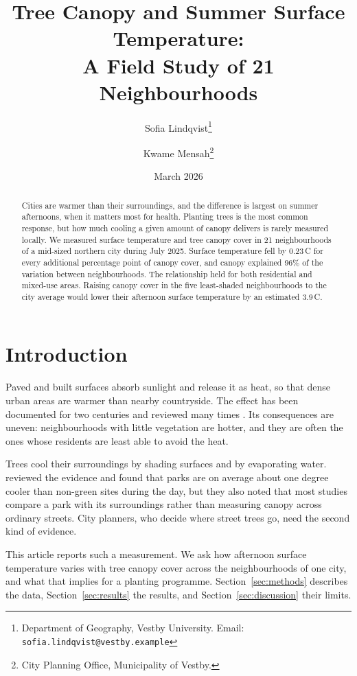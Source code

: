 \documentclass[11pt,a4paper]{article}
\title{Tree Canopy and Summer Surface Temperature:\\A Field Study of 21 Neighbourhoods}
\author{Sofia Lindqvist\thanks{Department of Geography, Vestby University. Email: \texttt{sofia.lindqvist@vestby.example}}
\and Kwame Mensah\thanks{City Planning Office, Municipality of Vestby.}}
\date{March 2026}
\begin{document}
\maketitle

\begin{abstract}
Cities are warmer than their surroundings, and the difference is largest on summer afternoons, when it matters most for health. Planting trees is the most common response, but how much cooling a given amount of canopy delivers is rarely measured locally. We measured surface temperature and tree canopy cover in 21 neighbourhoods of a mid-sized northern city during July 2025. Surface temperature fell by 0.23\,\textdegree C for every additional percentage point of canopy cover, and canopy explained 96\% of the variation between neighbourhoods. The relationship held for both residential and mixed-use areas. Raising canopy cover in the five least-shaded neighbourhoods to the city average would lower their afternoon surface temperature by an estimated 3.9\,\textdegree C.
\end{abstract}

\section{Introduction}\label{sec:introduction}
Paved and built surfaces absorb sunlight and release it as heat, so that dense urban areas are warmer than nearby countryside. The effect has been documented for two centuries and reviewed many times \citep{oke1982energetic,arnfield2003two}. Its consequences are uneven: neighbourhoods with little vegetation are hotter, and they are often the ones whose residents are least able to avoid the heat.

Trees cool their surroundings by shading surfaces and by evaporating water. \citet{bowler2010urban} reviewed the evidence and found that parks are on average about one degree cooler than non-green sites during the day, but they also noted that most studies compare a park with its surroundings rather than measuring canopy across ordinary streets. City planners, who decide where street trees go, need the second kind of evidence.

This article reports such a measurement. We ask how afternoon surface temperature varies with tree canopy cover across the neighbourhoods of one city, and what that implies for a planting programme. Section~\ref{sec:methods} describes the data, Section~\ref{sec:results} the results, and Section~\ref{sec:discussion} their limits.
\end{document}
